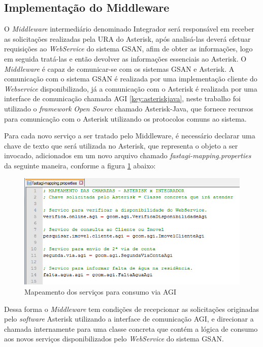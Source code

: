 \subsection{Implementação do Middleware}

O \textit{Middleware} intermediário denominado Integrador será responsável em receber as solicitações realizadas pela URA do Asterisk, após analisá-las deverá efetuar requisições ao \textit{WebService} do sistema GSAN, afim de obter as informações, logo em seguida tratá-las e então devolver as informações essenciais ao Asterisk.
O \textit{Middleware} é capaz de comunicar-se com os sistemas GSAN e Asterisk. A comunicação com o sistema GSAN é realizada por uma implementação cliente do \textit{Webservice} disponibilizado, já a comunicação com o Asterisk é realizada por uma interface de comunicação chamada AGI \ref{key:asteriskjava}, neste trabalho foi utilizado o \textit{framework} \textit{Open Source} chamado Asterisk-Java, que fornece recursos para comunicação com o Asterisk utilizando os protocolos comuns ao sistema.

Para cada novo serviço a ser tratado pelo Middleware, é necessário declarar uma chave de texto que será utilizada no Asterisk, que representa o objeto a ser invocado, adicionados em um novo arquivo chamado \textit{fastagi-mapping.properties} da seguinte maneira, conforme a figura \ref{figura:mapeamenteServicosAGI} abaixo:

\begin{figure}[H]
	\centering
	\caption{Mapeamento dos serviços para consumo via AGI}
	\label{figura:mapeamenteServicosAGI}
	\includegraphics{figuras/mapeamento_servicos_agi.png}
\end{figure}


Dessa forma o \textit{Middleware} tem condições de recepcionar as solicitações originadas pelo \textit{software} Asterisk utilizando a interface de comunicação AGI, e direcionar a chamada internamente para uma classe concreta que contém a lógica de consumo aos novos serviços disponibilizados pelo \textit{WebService} do sistema GSAN.

